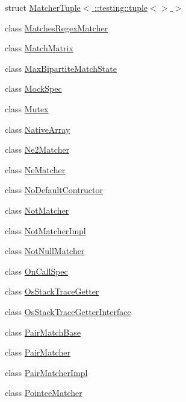 \begin{DoxyCompactItemize}
struct \hyperlink{structtesting_1_1internal_1_1MatcherTuple_3_01_1_1testing_1_1tuple_3_4_01_4}{Matcher\+Tuple$<$ \+::testing\+::tuple$<$$>$ $>$}
\item 
class \hyperlink{classtesting_1_1internal_1_1MatchesRegexMatcher}{Matches\+Regex\+Matcher}
\item 
class \hyperlink{classtesting_1_1internal_1_1MatchMatrix}{Match\+Matrix}
\item 
class \hyperlink{classtesting_1_1internal_1_1MaxBipartiteMatchState}{Max\+Bipartite\+Match\+State}
\item 
class \hyperlink{classtesting_1_1internal_1_1MockSpec}{Mock\+Spec}
\item 
class \hyperlink{classtesting_1_1internal_1_1Mutex}{Mutex}
\item 
class \hyperlink{classtesting_1_1internal_1_1NativeArray}{Native\+Array}
\item 
class \hyperlink{classtesting_1_1internal_1_1Ne2Matcher}{Ne2\+Matcher}
\item 
class \hyperlink{classtesting_1_1internal_1_1NeMatcher}{Ne\+Matcher}
\item 
class \hyperlink{classtesting_1_1internal_1_1NoDefaultContructor}{No\+Default\+Contructor}
\item 
class \hyperlink{classtesting_1_1internal_1_1NotMatcher}{Not\+Matcher}
\item 
class \hyperlink{classtesting_1_1internal_1_1NotMatcherImpl}{Not\+Matcher\+Impl}
\item 
class \hyperlink{classtesting_1_1internal_1_1NotNullMatcher}{Not\+Null\+Matcher}
\item 
class \hyperlink{classtesting_1_1internal_1_1OnCallSpec}{On\+Call\+Spec}
\item 
class \hyperlink{classtesting_1_1internal_1_1OsStackTraceGetter}{Os\+Stack\+Trace\+Getter}
\item 
class \hyperlink{classtesting_1_1internal_1_1OsStackTraceGetterInterface}{Os\+Stack\+Trace\+Getter\+Interface}
\item 
class \hyperlink{classtesting_1_1internal_1_1PairMatchBase}{Pair\+Match\+Base}
\item 
class \hyperlink{classtesting_1_1internal_1_1PairMatcher}{Pair\+Matcher}
\item 
class \hyperlink{classtesting_1_1internal_1_1PairMatcherImpl}{Pair\+Matcher\+Impl}
\item 
class \hyperlink{classtesting_1_1internal_1_1PointeeMatcher}{Pointee\+Matcher}
\item 

\end{DoxyCompactItemize}

